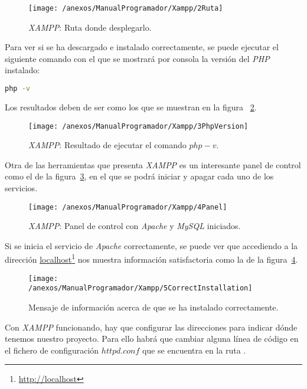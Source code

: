 \begin{figure}[h]
	\centering
	\texttt{[image: /anexos/ManualProgramador/Xampp/2Ruta]}
	\caption{\textit{XAMPP}: Ruta donde desplegarlo.}
	\label{img:XAMPP_Ruta}
\end{figure}

Para ver si se ha descargado e instalado correctamente, se puede ejecutar el siguiente comando con el que se mostrará por consola la versión del \textit{PHP} instalado:
\begin{lstlisting}[language=bash]
			php -v
\end{lstlisting}

Los resultados deben de ser como los que se muestran en la figura ~\ref{img:XAMPP_PHP_v}.

\begin{figure}[h]
	\centering
	\texttt{[image: /anexos/ManualProgramador/Xampp/3PhpVersion]}
	\caption{\textit{XAMPP}: Resultado de ejecutar el comando $php -v$.}
	\label{img:XAMPP_PHP_v}
\end{figure}

Otra de las herramientas que presenta \textit{XAMPP} es un interesante panel de control como el de la figura~\ref{img:XAMPP_Panel}, en el que se podrá iniciar y apagar cada uno de los servicios.

\begin{figure}[h]
	\centering
	\texttt{[image: /anexos/ManualProgramador/Xampp/4Panel]}
	\caption{\textit{XAMPP}: Panel de control con \textit{Apache} y \textit{MySQL} iniciados.}
	\label{img:XAMPP_Panel}
\end{figure}

Si se inicia el servicio de \textit{Apache} correctamente, se puede ver que accediendo a la dirección \href{http://localhost}{localhost}\footnote{\url{http://localhost}} nos muestra información satisfactoria como la de la figura~\ref{img:XAMPP_Correct}.

\begin{figure}[h]
	\centering
	\texttt{[image: /anexos/ManualProgramador/Xampp/5CorrectInstallation]}
	\caption{Mensaje de información acerca de que se ha instalado correctamente.}
	\label{img:XAMPP_Correct}
\end{figure}

Con \textit{XAMPP} funcionando, hay que configurar las direcciones para indicar dónde tenemos nuestro proyecto. Para ello habrá que cambiar alguna línea de código en el fichero de configuración $httpd.conf$ que se encuentra en la ruta \textit{}.

